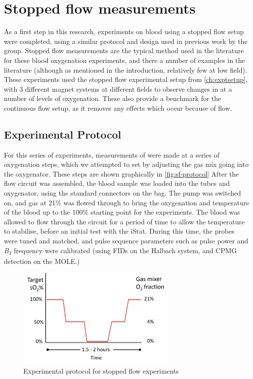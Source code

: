 \chapter{Stopped flow \SOtwo measurements}\label{ch:stoppedflow}

As a first step in this research, experiments on blood using a stopped flow setup were completed, using a similar protocol and design used in previous work by the group.
Stopped flow measurements are the typical method used in the literature for these blood oxygenation \Ttwo experiments, and there a number of examples in the literature\cite{BrooksComparisont2relaxation1995,BryantMagneticrelaxationblood1990,GomoriNMRRelaxationTimes1987} (although as mentioned in the introduction, relatively few at low field).
These experiments used the stopped flow experimental setup from \autoref{ch:exptsetup}, with 3 different magnet systems at different fields to observe changes in \Ttwo at a number of levels of oxygenation.
These also provide a benchmark for the continuous flow setup, as it removes any effects which occur because of flow.

\section{Experimental Protocol}
For this series of experiments, measurements of \Ttwo were made at a series of oxygenation steps, which we attempted to set by adjusting the gas mix going into the oxygenator.
These steps are shown graphically in \autoref{fig:sf-protocol}
After the flow circuit was assembled, the blood sample was loaded into the tubes and oxygenator, using the standard connectors on the bag.
The pump was switched on, and gas at 21\% \Otwo was flowed through to bring the oxygenation and temperature of the blood up to the 100\% starting point for the experiments.
The blood was allowed to flow through the circuit for a period of time to allow the temperature to stabilise, before an initial test with the iStat.
During this time, the probes were tuned and matched, and pulse sequence parameters such as pulse power and \textit{B\textsubscript{1}} frequency were calibrated (using FIDs on the Halbach system, and CPMG detection on the MOLE.)
\begin{figure}[t]
\centering
\includegraphics[width=0.7\textwidth]{figures/stoppedflow/stoppedflowprotocol.png}
\caption{Experimental protocol for stopped flow experiments}
\label{fig:sf-protocol}
\end{figure}

